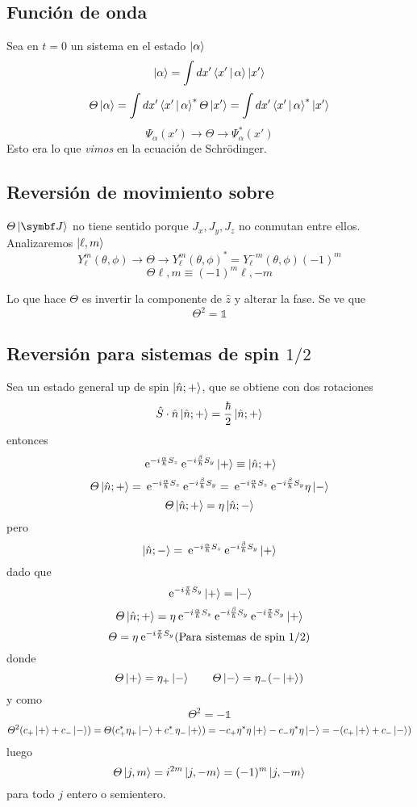 \documentclass[10pt,oneside]{CBFT_book}
\begin{document}
\subsection{Función de onda}

Sea en $t=0$ un sistema en el estado $\Ket{\alpha}$
\[
	\Ket{\alpha} = \int dx' \Braket{x'|\alpha} \Ket{x'} 
\]
\[
	\Theta\Ket{\alpha} = \int dx' \Braket{x'|\alpha}^* \Theta \Ket{x'} =
	\int dx' \Braket{x'|\alpha}^* \Ket{x'} 
\]
\[
	\Psi_\alpha (x') \longrightarrow \Theta \longrightarrow \Psi_\alpha^* (x')
\]
Esto era lo que {\it vimos} en la ecuación de Schrödinger.

\subsection{Reversión de movimiento sobre }


$\Theta \Ket{\vb{J}}$ no tiene sentido porque $J_x,J_y,J_z$ no conmutan entre ellos.
Analizaremos $\Ket{\ell,m}$
\[
	Y_\ell^m(\theta,\phi) \longrightarrow\Theta\longrightarrow Y_\ell^m(\theta,\phi)^* =
	Y_\ell^{-m}(\theta,\phi)(-1)^m
\]
\[
	\Theta{\ell,m} \equiv (-1)^m {\ell,-m}
\]

Lo que hace $\Theta$ es invertir la componente de $\hat{z}$ y alterar la fase. Se ve que 
\[
	\Theta^2 = \mathbb{1}
\]

\subsection{Reversión para sistemas de spin $1/2$}

Sea un estado general up de spin $\Ket{\hat{n};+}$, que se obtiene con dos rotaciones 
\[
	\hat{S}\cdot\hat{n} \Ket{\hat{n};+} = \frac{\hbar}{2} \Ket{\hat{n};+}
\]
entonces
\[
	\:\mathrm{e}^{-i\frac{\alpha}{\hbar}S_z}\:\mathrm{e}^{-i\frac{\beta}{\hbar}S_y} \Ket{+} \equiv
	 \Ket{\hat{n};+}
\]
\[
	\Theta \Ket{\hat{n};+} = \:\mathrm{e}^{-i\frac{\alpha}{\hbar}S_z}\:\mathrm{e}^{-i\frac{\beta}{\hbar}S_y} =
	\:\mathrm{e}^{-i\frac{\alpha}{\hbar}S_z}\:\mathrm{e}^{-i\frac{\beta}{\hbar}S_y} \eta\Ket{-}
\]
\[
	\Theta \Ket{\hat{n};+} = \eta \Ket{\hat{n};-}
\]
pero 
\[
	\Ket{\hat{n};-} = \:\mathrm{e}^{-i\frac{\alpha}{\hbar}S_z}\:\mathrm{e}^{-i\frac{\beta}{\hbar}S_y}\Ket{+}
\]
dado que 
\[
	 \:\mathrm{e}^{-i\frac{\pi}{\hbar}S_y} \Ket{+} = \Ket{-}
\]
\[
	\Theta \Ket{\hat{n};+} = \eta \:\mathrm{e}^{-i\frac{\alpha}{\hbar}S_z}\:\mathrm{e}^{-i\frac{\beta}{\hbar}S_y}
	\:\mathrm{e}^{-i\frac{\pi}{\hbar}S_y} \Ket{+}
\]
\[
	\Theta = \eta \:\mathrm{e}^{-i\frac{\pi}{\hbar}S_y} \text{(Para sistemas de spin 1/2)}
\]
donde 
\[
	\Theta\Ket{+} = \eta_+ \Ket{-} \qquad \Theta\Ket{-} = \eta_- (-\Ket{+})
\]
y como
\[
	\Theta^2 = -\mathbb{1}
\]
\[
	\Theta^2 ( c_+\Ket{+} + c_-\Ket{-}) = \Theta ( c_+^*\eta_+\Ket{-} + c_-^*\eta_-\Ket{+}) =
	-c_+\eta^*\eta \Ket{+} - c_-\eta^*\eta \Ket{-} = -( c_+\Ket{+} + c_-\Ket{-})
\]
luego
\[
	\Theta\Ket{j,m} = i^{2m} \Ket{j,-m} = (-1)^m \Ket{j,-m}
\]
para todo $j$ entero o semientero.
\end{document}
